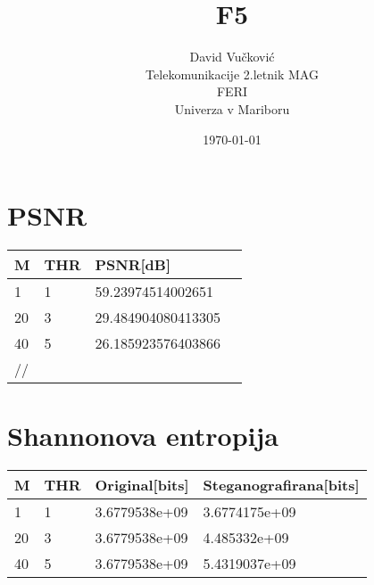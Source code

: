 \documentclass[12pt,a4paper]{article}
\title{\huge{\textbf{F5}}}
\author{
        David Vučković \\
                Telekomunikacije 2.letnik MAG\\
        FERI\\
        Univerza v Mariboru}
\date{\today}
\begin{document}
\maketitle
\thispagestyle{empty}

\clearpage %


\thispagestyle{empty}

\clearpage %
\section{PSNR} %
\begin{table}
    \begin{tabular}{llll}
    M     & THR & PSNR[dB] \\ \hline
    1  & 1               &  59.23974514002651               \\
    20 & 3               & 29.484904080413305                    \\
    40     & 5             & 26.185923576403866                       \\
    //
    \end{tabular}
\end{table}
\section{Shannonova entropija}
\begin{table}
    \begin{tabular}{llll}
    M     & THR & Original[bits] & Steganografirana[bits] \\ \hline
    1  & 1               &  3.6779538e+09     & 3.6774175e+09           \\
    20 & 3               & 3.6779538e+09         &   4.485332e+09         \\
    40     & 5             & 3.6779538e+09        &   5.4319037e+09            \\
    \end{tabular}
\end{table}
\end{document}
